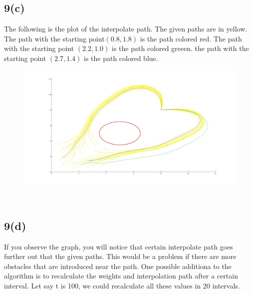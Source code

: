 \documentclass{article}
\begin{document}
\subsection*{9(c)}
The following is the plot of the interpolate path. The given paths are in yellow. The path with the starting point$(0.8, 1.8)$ is the path colored red. The path with the starting point $(2.2, 1.0)$ is the path colored greeen. the path with the starting point $(2.7, 1.4)$ is the path colored blue.
\begin{figure}[h]
\centering
\includegraphics[width=6in]{p9.jpg}
\end{figure}\\
\subsection*{9(d)}
If you observe the graph, you will notice that certain interpolate path goes further out that the given paths. This would be a problem if there are more obstacles that are introduced near the path. One possible additiona to the algorithm is to recalculate the weights and interpolation path after a certain interval. Let say t is 100, we could recalculate all these values in 20 intervals. 
\end{document}
